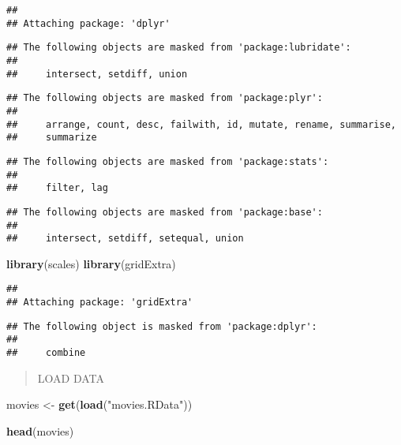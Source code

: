 \documentclass[]{article}
\newenvironment{Shaded}{\begin{snugshade}}{\end{snugshade}}
\newcommand{\KeywordTok}[1]{\textcolor[rgb]{0.13,0.29,0.53}{\textbf{#1}}}
\newcommand{\NormalTok}[1]{#1}
\newcommand{\StringTok}[1]{\textcolor[rgb]{0.31,0.60,0.02}{#1}}
\begin{document}
\begin{verbatim}
## 
## Attaching package: 'dplyr'
\end{verbatim}

\begin{verbatim}
## The following objects are masked from 'package:lubridate':
## 
##     intersect, setdiff, union
\end{verbatim}

\begin{verbatim}
## The following objects are masked from 'package:plyr':
## 
##     arrange, count, desc, failwith, id, mutate, rename, summarise,
##     summarize
\end{verbatim}

\begin{verbatim}
## The following objects are masked from 'package:stats':
## 
##     filter, lag
\end{verbatim}

\begin{verbatim}
## The following objects are masked from 'package:base':
## 
##     intersect, setdiff, setequal, union
\end{verbatim}

\begin{Shaded}
\begin{Highlighting}[]
\KeywordTok{library}\NormalTok{(scales)}
\KeywordTok{library}\NormalTok{(gridExtra)}
\end{Highlighting}
\end{Shaded}

\begin{verbatim}
## 
## Attaching package: 'gridExtra'
\end{verbatim}

\begin{verbatim}
## The following object is masked from 'package:dplyr':
## 
##     combine
\end{verbatim}

\begin{quote}
LOAD DATA
\end{quote}

\begin{Shaded}
\begin{Highlighting}[]
\NormalTok{movies <-}\StringTok{ }\KeywordTok{get}\NormalTok{(}\KeywordTok{load}\NormalTok{(}\StringTok{"movies.RData"}\NormalTok{))}
\end{Highlighting}
\end{Shaded}

\begin{Shaded}
\begin{Highlighting}[]
\KeywordTok{head}\NormalTok{(movies)}
\end{Highlighting}
\end{Shaded}
\end{document}
